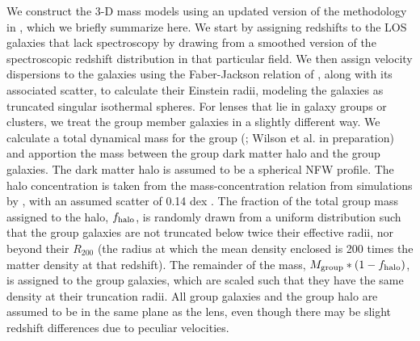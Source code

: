 We construct the 3-D mass models using an updated version of the methodology in \citet{Wong11}, which we briefly summarize here.  We start by assigning redshifts to the LOS galaxies that lack spectroscopy by drawing from a smoothed version of the spectroscopic redshift distribution in that particular field.  We then assign velocity dispersions to the galaxies using the Faber-Jackson relation of \citet{Bernardi03}, along with its associated scatter, to calculate their Einstein radii, modeling the galaxies as truncated singular isothermal spheres.  For lenses that lie in galaxy groups or clusters, we treat the group member galaxies in a slightly different way.  We calculate a total dynamical mass for the group (\citealt{Momcheva06}; Wilson et al. in preparation) and apportion the mass between the group dark matter halo and the group galaxies.  The dark matter halo is assumed to be a spherical NFW profile.  The halo concentration is taken from the mass-concentration relation from simulations by \citet{Zhao09}, with an assumed scatter of 0.14 dex \citep{Bullock01}.  The fraction of the total group mass assigned to the halo, $f_{\rm{halo}}$, is randomly drawn from a uniform distribution such that the group galaxies are not truncated below twice their effective radii, nor beyond their $R_200$ (the radius at which the mean density enclosed is 200 times the matter density at that redshift).  The remainder of the mass, $M_{\rm{group}}*(1-f_{\rm{halo}})$, is assigned to the group galaxies, which are scaled such that they have the same density at their truncation radii.  All group galaxies and the group halo are assumed to be in the same plane as the lens, even though there may be slight redshift differences due to peculiar velocities.